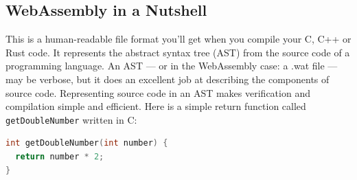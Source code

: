 \documentclass[10pt]{article}
\begin{document}
\begin{sloppypar}
  \subsection{WebAssembly in a Nutshell}
  \label{sec:webassembly-text-format}

  This is a human-readable file format you’ll get when you compile your C, C++ or Rust code. It represents the abstract syntax tree (AST) from the source code of a programming language. An AST — or in the WebAssembly case: a .wat file — may be verbose, but it does an excellent job at describing the components of source code. Representing source code in an AST makes verification and compilation simple and efficient. Here is a simple return function called \lstinline{getDoubleNumber} written in C:

  \begin{lstlisting}[language=C, caption=Python example, label=lst:python-example]
int getDoubleNumber(int number) {
  return number * 2;
}
\end{lstlisting}

  \pagebreak
  
  

\end{sloppypar}
\end{document}
